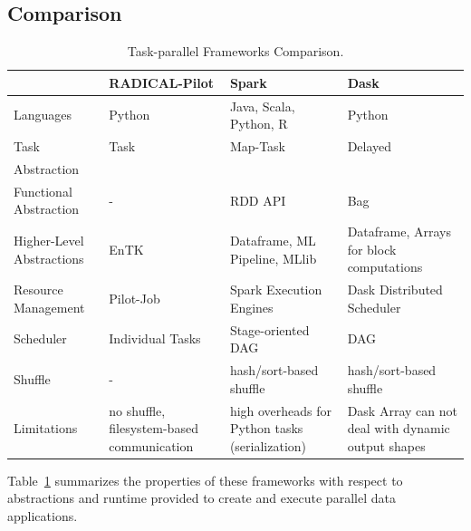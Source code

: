 \subsection{Comparison}
\begin{table}[t]
    \begin{tabular}{@{}p{2.75cm}|p{3.25cm}p{3.25cm}p{3.25cm}@{}}
        \toprule
        &\textbf{RADICAL-Pilot} &
        \textbf{Spark} &
        \textbf{Dask} \\
        \midrule
        Languages &
        Python &
        Java, Scala, Python, R &
        Python\\
        Task &
        Task &
        Map-Task &
        Delayed\\
        Abstraction &
        &
        & \\
        Functional Abstraction  &
        - &
        RDD API &
        Bag\\
        Higher-Level Abstractions &
        EnTK~\cite{balasubramanian2018harnessing} &
        Dataframe, ML Pipeline, MLlib~\cite{meng2016mllib} &
        Dataframe, Arrays for block computations\\
        Resource Management &
        Pilot-Job &
        Spark Execution Engines &
        Dask Distributed Scheduler\\
        Scheduler    &
        Individual Tasks &
        Stage-oriented DAG &
        DAG\\
        Shuffle      &
        -       &
        hash/sort-based shuffle &
        hash/sort-based shuffle\\
        Limitations &
        no shuffle, filesystem-based communication  &
        high overheads for Python tasks (serialization)   &
        Dask Array can not deal with dynamic output shapes\\
        \bottomrule
    \end{tabular}
    \caption{Task-parallel Frameworks Comparison.\label{tab:frameworks}}
\end{table}

Table~\ref{tab:frameworks} summarizes the properties of these frameworks with respect to abstractions and runtime provided to create and execute parallel data applications. 

